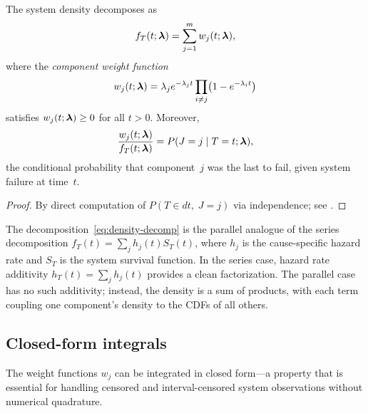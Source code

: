 \begin{lemma}\label{lem:density-decomp}
  The system density decomposes as
  \begin{equation}\label{eq:density-decomp}
    f_T(t; \boldsymbol{\lambda}) = \sum_{j=1}^m w_j(t; \boldsymbol{\lambda}),
  \end{equation}
  where the \emph{component weight function}
  \begin{equation}\label{eq:wj-def}
    w_j(t; \boldsymbol{\lambda}) = \lambda_j e^{-\lambda_j t} \prod_{i \neq j}
    \bigl(1 - e^{-\lambda_i t}\bigr)
  \end{equation}
  satisfies $w_j(t; \boldsymbol{\lambda}) \geq 0$ for all $t > 0$.  Moreover,
  \begin{equation}\label{eq:posterior-J}
    \frac{w_j(t; \boldsymbol{\lambda})}{f_T(t; \boldsymbol{\lambda})} = P(J = j \mid T = t; \boldsymbol{\lambda}),
  \end{equation}
  the conditional probability that component~$j$ was the last to fail,
  given system failure at time~$t$.
\end{lemma}

\begin{proof}
By direct computation of $P(T \in dt,\; J = j)$ via independence;
see .
\end{proof}

\begin{remark}\label{rmk:series-contrast-density}
The decomposition~\eqref{eq:density-decomp} is the parallel analogue
of the series decomposition $f_T(t) = \sum_j h_j(t) S_T(t)$, where
$h_j$ is the cause-specific hazard rate and $S_T$ is the system survival
function.  In the series case, hazard rate additivity
$h_T(t) = \sum_j h_j(t)$ provides a clean factorization.  The parallel
case has no such additivity; instead, the density is a sum of products,
with each term coupling one component's density to the CDFs of all
others.
\end{remark}

\subsection{Closed-form integrals}
\label{sec:closed-form-integral}

The weight functions $w_j$ can be integrated in closed form---a property
that is essential for handling censored and interval-censored system
observations without numerical quadrature.

